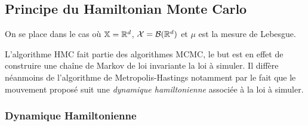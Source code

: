 \documentclass[10pt,a4paper]{article}
\begin{document}



\subsection{Principe du Hamiltonian Monte Carlo}

On se place dans le cas où $\mathbb{X} = \mathbb{R}^d$, $\mathcal{X} = \mathcal{B}(\mathbb{R}^d)$ et $\mu$ est la mesure de Lebesgue. 

L'algorithme HMC fait partie des algorithmes MCMC, le but est en effet de construire une chaîne de Markov de loi invariante la loi à simuler. Il diffère néanmoins de l'algorithme de Metropolis-Hastings notamment par le fait que le mouvement proposé suit une \emph{dynamique hamiltonienne} associée à la loi à simuler.

\subsubsection{Dynamique Hamiltonienne}
\end{document}
